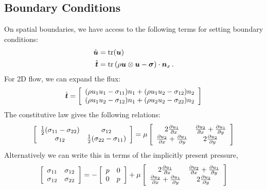 \documentclass{article}
\begin{document}
\subsection*{Boundary Conditions}
On spatial boundaries, we have access to the following terms for setting boundary conditions:
\begin{equation*}
\begin{aligned}
\hat{\boldsymbol u}&=\operatorname*{tr}(\boldsymbol u)\\
\hat{\boldsymbol t}&=\operatorname*{tr}\left( \rho\boldsymbol u\otimes\boldsymbol u-\boldsymbol\sigma \right)\cdot\boldsymbol n_x\,.
\end{aligned}
\end{equation*}
For 2D flow, we can expand the flux:
\begin{equation*}
\hat{\boldsymbol t}=\left[ 
\begin{array}{c}
(\rho u_1u_1-\sigma_{11})n_1 + (\rho u_1u_2-\sigma_{12})n_2 \\
(\rho u_1u_2-\sigma_{12})n_1 + (\rho u_2u_2-\sigma_{22})n_2 \\
\end{array}
 \right]
\end{equation*}
The constitutive law gives the following relations:
\begin{equation*}
\left[ 
\begin{array}{cc}
\frac{1}{2}(\sigma_{11}-\sigma_{22}) & \sigma_{12} \\
\sigma_{12} & \frac{1}{2}(\sigma_{22}-\sigma_{11}) \\
\end{array}
 \right]
=\mu
\left[ 
\begin{array}{cc}
2\frac{\partial u_1}{\partial x} & \frac{\partial u_2}{\partial x}+\frac{\partial u_1}{\partial y} \\
\frac{\partial u_2}{\partial x}+\frac{\partial u_1}{\partial y} & 2\frac{\partial u_2}{\partial y} \\
\end{array}
 \right]
\end{equation*}
Alternatively we can write this in terms of the implicitly present pressure,
\begin{equation*}
\left[ 
\begin{array}{cc}
\sigma_{11} & \sigma_{12} \\
\sigma_{12} & \sigma_{22} \\
\end{array}
 \right]
=
-\left[ 
\begin{array}{cc}
p & 0 \\
0 & p \\
\end{array}
 \right]
+
\mu
\left[ 
\begin{array}{cc}
2\frac{\partial u_1}{\partial x} & \frac{\partial u_2}{\partial x}+\frac{\partial u_1}{\partial y} \\
\frac{\partial u_2}{\partial x}+\frac{\partial u_1}{\partial y} & 2\frac{\partial u_2}{\partial y} \\
\end{array}
 \right]
\end{equation*}
\end{document}
